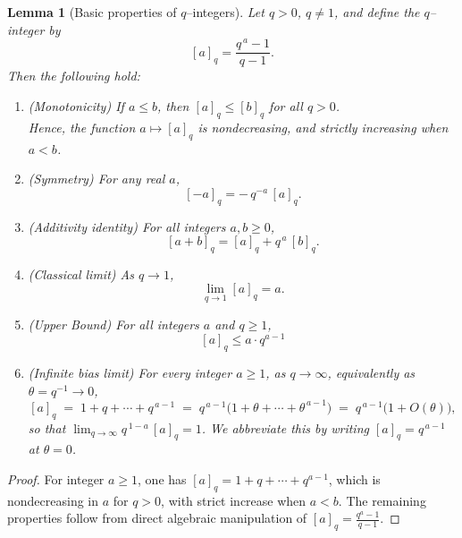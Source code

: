 \documentclass[11pt]{article}
\theoremstyle{plain}  %
\newtheorem{lemma}[theorem]{Lemma}
\begin{document}
\begin{lemma}[Basic properties of $q$--integers]\label{lem:qinteger-facts}
Let $q>0$, $q\neq1$, and define the $q$--integer by
$$
[a]_q = \frac{q^{\,a}-1}{q-1}.
$$
Then the following hold:
\begin{enumerate}[label=\roman*)]
\item (\emph{Monotonicity}) If $a\le b$, then $[a]_q \le [b]_q$ for all $q>0$.\\
Hence, the function $a\mapsto [a]_q$ is nondecreasing, and strictly increasing when $a<b$.

\item (\emph{Symmetry}) For any real $a$,
$$
[-a]_q = -\,q^{-a}\,[a]_q.
$$

\item (\emph{Additivity identity}) For all integers $a,b\ge0$,
$$
[a+b]_q = [a]_q + q^{\,a}\,[b]_q.
$$

\item (\emph{Classical limit}) As $q\to1$,
$$
\lim_{q\to1} [a]_q = a.
$$


\item (\emph{Upper Bound}) For all integers $a$ and $q \ge 1$,
$$
[a]_q \le a\cdot q^{a-1}
$$

\item\label{it:qintlead} (\emph{Infinite bias limit}) For every integer $a\ge1$, as
$q\to\infty$, equivalently as $\theta = q^{-1}\to 0$,
$$
  [a]_q \;=\; 1+q+\cdots+q^{\,a-1}
        \;=\; q^{\,a-1}\bigl(1+\theta+\cdots+\theta^{\,a-1}\bigr)
        \;=\; q^{\,a-1}\bigl(1+O(\theta)\bigr),
$$
so that $\lim_{q\to\infty} q^{\,1-a}\,[a]_q = 1$. We abbreviate this by writing
$[a]_q = q^{\,a-1}$ at $\theta = 0$.

\end{enumerate}
\end{lemma}

\begin{proof}
For integer $a\ge1$, one has $[a]_q = 1 + q + \cdots + q^{a-1}$, 
which is nondecreasing in $a$ for $q>0$, with strict increase when $a<b$.
The remaining properties follow from direct algebraic manipulation of 
$[a]_q = \frac{q^{a}-1}{q-1}$.
\end{proof}


 

\end{document}
